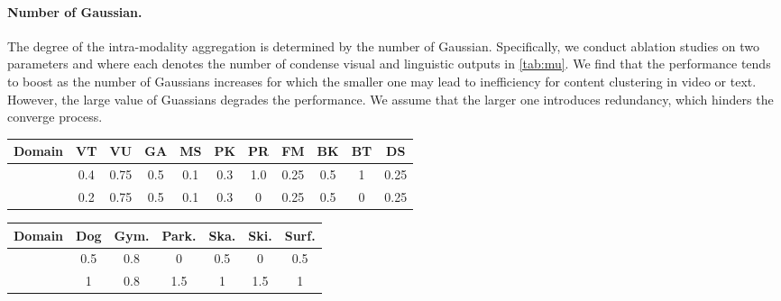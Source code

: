 \documentclass[10pt,twocolumn,letterpaper]{article}
\begin{document}
\paragraph{Number of Gaussian.}
The degree of the intra-modality aggregation is determined by the number of Gaussian. Specifically, we conduct ablation studies on two parameters  and  where each denotes the number of condense visual and linguistic outputs in \cref{tab:mu}. We find that the performance tends to boost as the number of Gaussians increases for which the smaller one may lead to inefficiency for content clustering in video or text. However, the large value of Guassians degrades the performance. We assume that the larger one introduces redundancy, which hinders the converge process. 
\begin{table*}[t]
\begin{minipage}[c]{\textwidth}
    \begin{minipage}{0.35\textwidth}
    \makeatletter{}
    \centering
    \footnotesize
    \setlength{\tabcolsep}{2pt}
    \begin{tabular}{c | c c c c c c c c c c}
    \toprule
    Domain & VT & VU & GA & MS & PK & PR &FM & BK & BT & DS \\
    \midrule
     & 0.4 & 0.75 & 0.5 & 0.1 & 0.3 & 1.0 &0.25 &0.5 &1 &0.25 \\
    \midrule
     & 0.2 & 0.75 & 0.5 & 0.1 & 0.3 & 0 &0.25 &0.5 &0 &0.25 \\
    \bottomrule
    \end{tabular}
    \caption{\textbf{ and  for TVSum.}}
    \label{tab:sup_tvsum_loss}
    \end{minipage}
    \hspace{0.04\textwidth}
    \begin{minipage}{0.3
    \textwidth}
    \makeatletter{}
    \centering
    \footnotesize
    \setlength{\tabcolsep}{2pt}
    \vspace{10pt}
    \begin{tabular}{c | c c c c c c}
    \toprule
    Domain & Dog & Gym. & Park. & Ska. & Ski. & Surf. \\
    \midrule
     & 0.5 & 0.8 & 0 & 0.5 & 0 & 0.5 \\
    \midrule
     & 1 & 0.8 & 1.5 & 1 & 1.5 & 1 \\
    \bottomrule
    \end{tabular}
    \caption{\textbf{ and  for YoutubeHL using SF+C feature.}}
    \label{tab:sup_youtubehl_sfc_loss}
    \end{minipage}

\end{minipage}
\end{table*}
\end{document}
